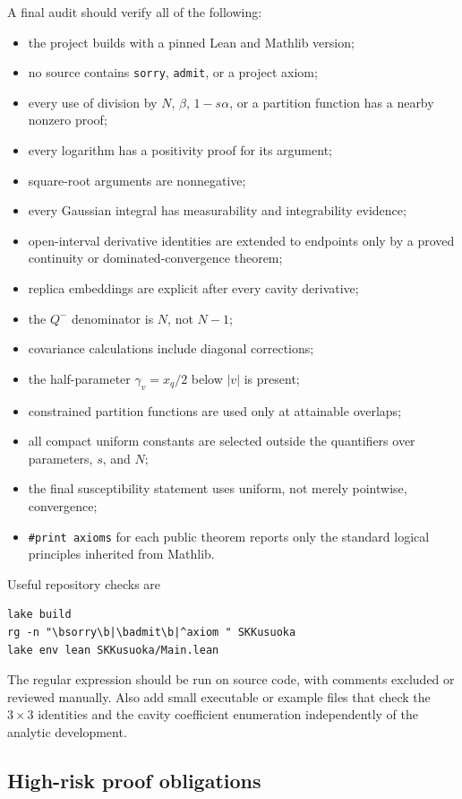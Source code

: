 \documentclass[11pt]{article}
\numberwithin{equation}{section}
\newcommand{\1}{\mathbf 1}
\begin{document}
A final audit should verify all of the following:
\begin{itemize}[leftmargin=2em]
\item the project builds with a pinned Lean and Mathlib version;
\item no source contains \texttt{sorry}, \texttt{admit}, or a project axiom;
\item every use of division by $N$, $\beta$, $1-s\alpha$, or a partition
      function has a nearby nonzero proof;
\item every logarithm has a positivity proof for its argument;
\item square-root arguments are nonnegative;
\item every Gaussian integral has measurability and integrability evidence;
\item open-interval derivative identities are extended to endpoints only by
      a proved continuity or dominated-convergence theorem;
\item replica embeddings are explicit after every cavity derivative;
\item the $Q^-$ denominator is $N$, not $N-1$;
\item covariance calculations include diagonal corrections;
\item the half-parameter $\gamma_v=x_q/2$ below $|v|$ is present;
\item constrained partition functions are used only at attainable overlaps;
\item all compact uniform constants are selected outside the quantifiers
      over parameters, $s$, and $N$;
\item the final susceptibility statement uses uniform, not merely pointwise,
      convergence;
\item \texttt{\#print axioms} for each public theorem reports only the
      standard logical principles inherited from Mathlib.
\end{itemize}

Useful repository checks are
\begin{lstlisting}
lake build
rg -n "\bsorry\b|\badmit\b|^axiom " SKKusuoka
lake env lean SKKusuoka/Main.lean
\end{lstlisting}
The regular expression should be run on source code, with comments excluded
or reviewed manually.  Also add small executable or example files that
check the $3\times3$ identities and the cavity coefficient enumeration
independently of the analytic development.

\subsection{High-risk proof obligations}
\end{document}
